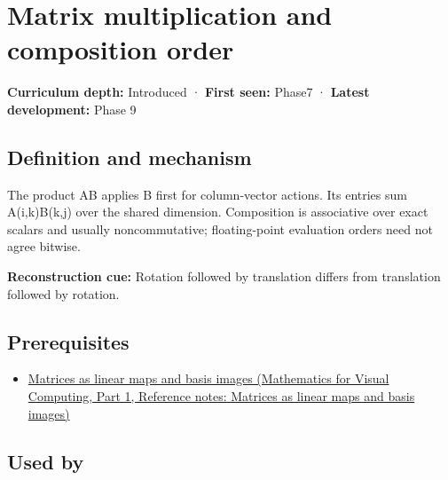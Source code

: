 \hypertarget{appendix-ab31ef447dbf}{}\label{referencestart:appendix-ab31ef447dbf}
\section{Matrix multiplication and composition order}\label{appendix-ab31ef447dbf-matrix-multiplication-and-composition-order}

\hypertarget{appendix-ab31ef447dbf-matrix-multiplication-and-composition-order}{}

\textbf{Curriculum depth:} Introduced · \textbf{First seen:} Phase7 · \textbf{Latest development:} Phase 9

\begin{allmightroledefinition}

\subsection{Definition and mechanism}\label{appendix-ab31ef447dbf-definition-and-mechanism}

\hypertarget{appendix-ab31ef447dbf-definition-and-mechanism}{}

The product AB applies B first for column-vector actions. Its entries sum A(i,k)B(k,j) over the shared dimension. Composition is associative over exact scalars and usually noncommutative; floating-point evaluation orders need not agree bitwise.

\end{allmightroledefinition}

\textbf{Reconstruction cue:} Rotation followed by translation differs from translation followed by rotation.

\subsection{Prerequisites}\label{appendix-ab31ef447dbf-prerequisites}

\hypertarget{appendix-ab31ef447dbf-prerequisites}{}

\begin{itemize}
\tightlist
\item
  \href{../02-Mathematics-for-Visual-Computing-P01/main.pdf\#nameddest=appendix-bd39c3bf5d64}{Matrices as linear maps and basis images (Mathematics for Visual Computing, Part 1, Reference notes: Matrices as linear maps and basis images)}
\end{itemize}

\subsection{Used by}\label{appendix-ab31ef447dbf-used-by}

